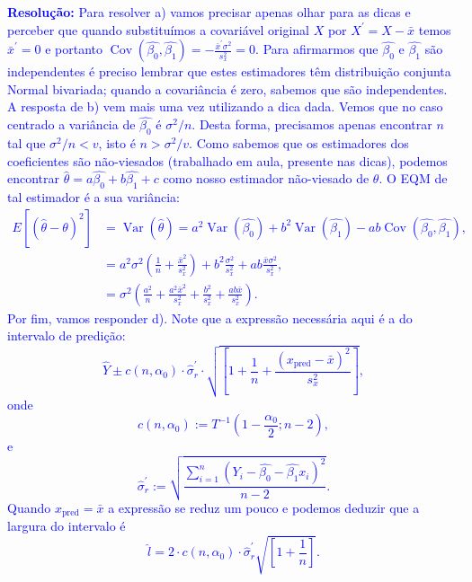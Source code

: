 \documentclass[a4paper,10pt, notitlepage]{report}
\newcommand{\vr}{\operatorname{Var}} %
\begin{document}
\textcolor{blue}{
\textbf{Resolução:}
Para resolver a) vamos precisar apenas olhar para as dicas e perceber que quando substituímos a covariável original $X$ por $X^\prime = X-\bar{x}$ temos $\bar{x}^\prime = 0$ e portanto $\operatorname{Cov}\left(\hat{\beta_0}, \hat{\beta_1} \right)  = -\frac{\bar{x}^\prime \sigma^2}{s_x^2} = 0$.
Para afirmarmos que $\hat{\beta_0}$ e $\hat{\beta_1}$ são independentes é  preciso lembrar que estes estimadores têm distribuição conjunta Normal bivariada; quando a covariância é zero, sabemos que são independentes.
A resposta de b) vem mais uma vez utilizando a dica dada.
Vemos que no caso centrado a variância de $\hat{\beta_0}$ é $\sigma^2/n$. 
Desta forma, precisamos apenas encontrar $n$ tal que $\sigma^2/n < v$, isto é $n > \sigma^2/v$.
Como sabemos que os estimadores dos coeficientes são não-viesados (trabalhado em aula, presente nas dicas), podemos encontrar $\hat{\theta} = a\hat{\beta_0} + b\hat{\beta_1} +c$ como nosso estimador não-viesado de $\theta$.
O EQM de tal estimador é a sua variância:
\begin{align*}
 E[(\hat{\theta}-\theta)^2] &= \vr(\hat{\theta}) = a^2 \vr(\hat{\beta_0}) + b^2\vr(\hat{\beta_1}) -ab \operatorname{Cov}(\hat{\beta_0}, \hat{\beta_1}),\\
 &=  a^2 \sigma^2 \left( \frac{1}{n} + \frac{\bar{x}^2}{s_x^2} \right) + b^2\frac{\sigma^2}{s_x^2} + ab \frac{\bar{x}\sigma^2}{s_x^2},\\
 &= \sigma^2 \left(\frac{a^2}{n} + \frac{a^2\bar{x}^2}{s_x^2} + \frac{b^2}{s_x^2} + \frac{ab\bar{x}}{s_x^2}\right).
\end{align*}
Por fim, vamos responder d).
Note que a expressão necessária aqui é a do intervalo de predição:
\begin{equation*}
 \hat{Y} \pm  c(n, \alpha_0)\cdot\hat{\sigma}_r^\prime \cdot \sqrt{\left[ 1+ \frac{1}{n} + \frac{\left(x_{\text{pred}}-\bar{x}\right)^2}{s_x^2} \right]},
\end{equation*}
onde
\begin{equation*}
 c(n, \alpha_0) := T^{-1}\left(1-\frac{\alpha_0}{2}; n-2\right),
\end{equation*}
e
\begin{equation*}
 \hat{\sigma}_r^\prime := \sqrt{\frac{\sum_{i=1}^n \left(Y_i - \hat{\beta_0} - \hat{\beta_1}x_i \right)^2}{n-2}}.
\end{equation*}
Quando $x_{\text{pred}} = \bar{x}$ a expressão se reduz um pouco e podemos deduzir que a largura do intervalo é
\begin{equation*}
 \hat{l} = 2 \cdot c(n, \alpha_0) \cdot \hat{\sigma}_r^\prime \sqrt{\left[ 1+ \frac{1}{n}\right]}.

\end{equation*}}
\end{document}
